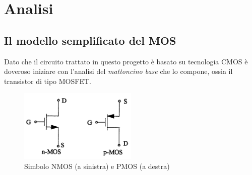 
\chapter{Analisi} %
\label{Chapter2}

\section{Il modello semplificato del MOS}
\label{sec:sec_mos}

Dato che il circuito trattato in questo progetto è basato su tecnologia CMOS è doveroso iniziare con l'analisi del \textit{mattoncino base} che lo compone, ossia il transistor di tipo MOSFET.

\begin{figure}[hbt!]
	\centering
	\includegraphics[width=0.5\textwidth]{figure/simboliMos.png}
	\caption{Simbolo NMOS (a sinistra) e PMOS (a destra)}
	\label{fig:simboliMos}
\end{figure}

